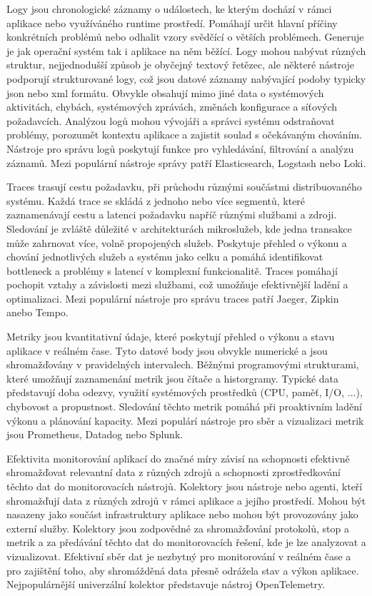 
Logy jsou chronologické záznamy o událostech, ke kterým dochází v rámci aplikace nebo využíváného runtime prostředí. Pomáhají určit hlavní příčiny konkrétních problémů nebo odhalit vzory svědčící o větších problémech. Generuje je jak operační systém tak i aplikace na něm běžící. Logy mohou nabývat různých struktur, nejjednodušší způsob je obyčejný textový řetězec, ale některé nástroje podporují strukturované logy, což jsou datové záznamy nabývající podoby typicky json nebo xml formátu. Obvykle obsahují mimo jiné data o systémových aktivitách, chybách, systémových zprávách, změnách konfigurace a síťových požadavcích. Analýzou logů mohou vývojáři a správci systému odstraňovat problémy, porozumět kontextu aplikace a zajistit soulad s očekávaným chováním. Nástroje pro správu logů poskytují funkce pro vyhledávání, filtrování a analýzu záznamů. Mezi populární nástroje správy patří Elasticsearch, Logstash nebo Loki.


Traces trasují cestu požadavku, při průchodu různými součástmi distribuovaného systému. Každá trace se skládá z jednoho nebo více segmentů, které zaznamenávají cestu a latenci požadavku napříč různými službami a zdroji. Sledování je zvláště důležité v architekturách mikroslužeb, kde jedna transakce může zahrnovat více, volně propojených služeb. Poskytuje přehled o výkonu a chování jednotlivých služeb a systému jako celku a pomáhá identifikovat bottleneck a problémy s latencí v komplexní funkcionalitě. Traces pomáhají pochopit vztahy a závislosti mezi službami, což umožňuje efektivnější ladění a optimalizaci. Mezi populární nástroje pro správu traces patří Jaeger, Zipkin anebo Tempo.


Metriky jsou kvantitativní údaje, které poskytují přehled o výkonu a stavu aplikace v reálném čase. Tyto datové body jsou obvykle numerické a jsou shromažďovány v pravidelných intervalech. Běžnými programovými strukturami, které umožňují zaznamenání metrik jsou čítače a historgramy. Typické data představují doba odezvy, využití systémových prostředků (CPU, paměť, I/O, ...), chybovost a propustnost. Sledování těchto metrik pomáhá při proaktivním ladění výkonu a plánování kapacity. Mezi populárí nástroje pro sběr a vizualizaci metrik jsou Prometheus, Datadog nebo Splunk.


Efektivita monitorování aplikací do značné míry závisí na schopnosti efektivně shromažďovat relevantní data z různých zdrojů a schopnosti zprostředkování těchto dat do monitorovacích nástrojů. Kolektory jsou nástroje nebo agenti, kteří shromažďují data z různých zdrojů v rámci aplikace a jejího prostředí. Mohou být nasazeny jako součást infrastruktury aplikace nebo mohou být provozovány jako externí služby. Kolektory jsou zodpovědné za shromažďování protokolů, stop a metrik a za předávání těchto dat do monitorovacích řešení, kde je lze analyzovat a vizualizovat. Efektivní sběr dat je nezbytný pro monitorování v reálném čase a pro zajištění toho, aby shromážděná data přesně odrážela stav a výkon aplikace. Nejpopulárnější univerzální kolektor představuje nástroj OpenTelemetry.

